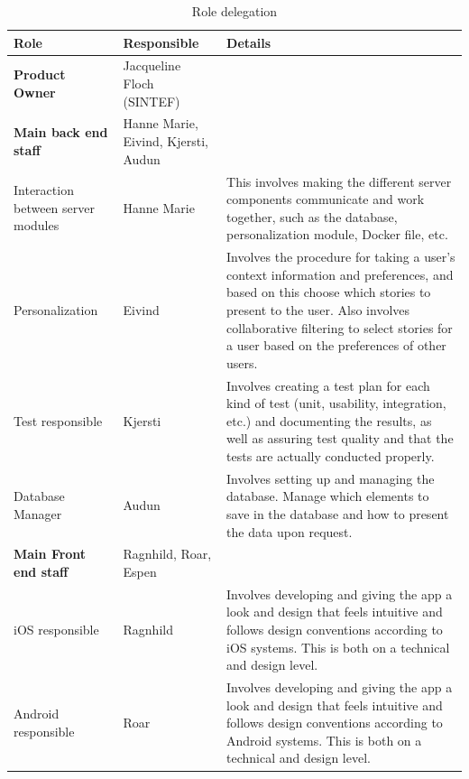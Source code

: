 \begin{table}[!h]
	\small
	\centering
		\caption{Role delegation}
		\begin{tabular}{ | p{3.7cm} | p{2.8cm} | p{10.5cm} |}
			\hline
			\textbf{Role} & \textbf{Responsible} & \textbf{Details} \\ \hline
			
			\textbf{Product Owner} & Jacqueline Floch (SINTEF) & \\ \hline
			
			\textbf{Main back end staff} & Hanne Marie, Eivind, Kjersti, Audun & \\ \hline
			
			Interaction between server modules & Hanne Marie & This involves making the different server components communicate and work together, such as the database, personalization module, Docker file, etc. \\ \hline
			
			Personalization & Eivind & Involves the procedure for taking a user's context information and preferences, and based on this choose which stories to present to the user. Also involves collaborative filtering to select stories for a user based on the preferences of other users. \\ \hline
			
			Test responsible & Kjersti & Involves creating a test plan for each kind of test (unit, usability, integration, etc.) and documenting the results, as well as assuring test quality and that the tests are actually conducted properly. \\ \hline
			
			Database Manager & Audun & Involves setting up and managing the database. Manage which elements to save in the database and how to present the data upon request. \\ \hline
			
			\textbf{Main Front end staff} & Ragnhild, Roar, Espen & \\ \hline
			
			iOS responsible & Ragnhild & Involves developing and giving the app a look and design that feels intuitive and follows design conventions according to iOS systems. This is both on a technical and design level. \\ \hline
			
			Android responsible & Roar & Involves developing and giving the app a look and design that feels intuitive and follows design conventions according to Android systems. This is both on a  technical and design level. \\ \hline
			

\end{tabular}
\end{table}
